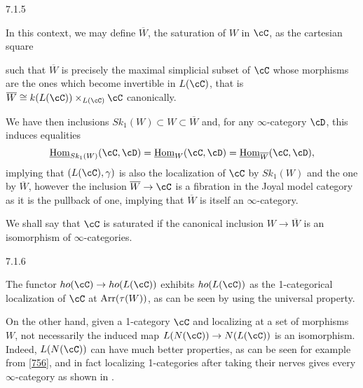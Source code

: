 \documentclass[a4paper,12pt]{scrartcl}
\begin{document}
\begin{rmk}\label{715}
  7.1.5

  In this context, we may define $\overline{W}$, the saturation of $W$ in $\cC$,
  as the cartesian square

  such that $\overline{W}$ is precisely the maximal simplicial subset of $\cC$
  whose morphisms are the ones which become invertible in $L(\cC)$, that is
  $\overline{W}\cong k(L(\cC))\times_{L(\cC)}\cC$ canonically.

  We have then inclusions $Sk_1(W)\subset W\subset\overline{W}$ and, for any
  $\infty$-category $\cD$, this induces equalities
  \[\Home_{Sk_1(W)}(\cC,\cD)=\Home_{W}(\cC,\cD)=\Home_{\overline{W}}(\cC,\cD),\]
  implying that $(L(\cC),\gamma)$ is also the localization of $\cC$ by $Sk_1(W)$
  and the one by $\overline{W}$, however the inclusion
  $\overline{W}\rightarrow\cC$ is a fibration in the Joyal model category as it
  is the pullback of one, implying that $\overline{W}$ is itself an
  $\infty$-category.

  We shall say that $\cC$ is saturated if the canonical inclusion
  $W\rightarrow\overline{W}$ is an isomorphism of $\infty$-categories.
\end{rmk}

\begin{rmk}
  7.1.6

  The functor $ho(\cC)\rightarrow ho(L(\cC))$ exhibits $ho(L(\cC))$ as the
  1-categorical localization of $\cC$ at $\operatorname{Arr}(\tau(W))$, as can be seen by
  using the universal property.

  On the other hand, given a 1-category $\cC$ and localizing at a set of
  morphisms $W$, not necessarily the induced map $L(N(\cC))\rightarrow
  N(L(\cC))$ is an isomorphism. Indeed, $L(N(\cC))$ can have much better
  properties, as can be seen for example from \ref{756}, and in fact localizing
  1-categories after taking their nerves gives every $\infty$-category as shown
  in \cite[Prop.\ 7.3.15]{Cis19}.
\end{rmk}
\end{document}
